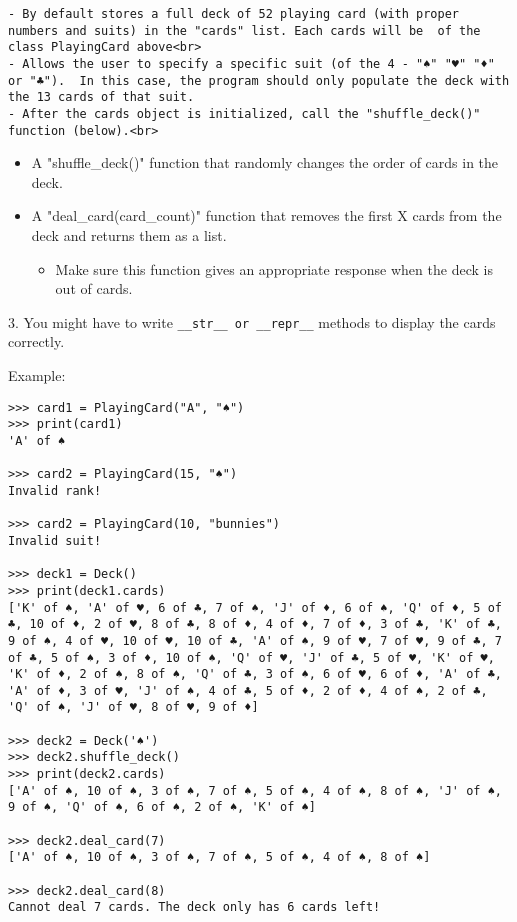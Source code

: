\documentclass[11pt]{article}
\providecommand{\tightlist}{%
      \setlength{\itemsep}{0pt}\setlength{\parskip}{0pt}}
\begin{document}
\begin{verbatim}
- By default stores a full deck of 52 playing card (with proper numbers and suits) in the "cards" list. Each cards will be  of the class PlayingCard above<br>
- Allows the user to specify a specific suit (of the 4 - "♠" "♥" "♦" or "♣").  In this case, the program should only populate the deck with the 13 cards of that suit.
- After the cards object is initialized, call the "shuffle_deck()" function (below).<br>
\end{verbatim}

\begin{itemize}
\tightlist
\item
  A "shuffle\_deck()" function that randomly changes the order of cards
  in the deck.
\item
  A "deal\_card(card\_count)" function that removes the first X cards
  from the deck and returns them as a list.

  \begin{itemize}
  \tightlist
  \item
    Make sure this function gives an appropriate response when the deck
    is out of cards.
  \end{itemize}
\end{itemize}

3. You might have to write \texttt{\_\_str\_\_\ or\ \_\_repr\_\_}
methods to display the cards correctly.

Example:

\begin{verbatim}
>>> card1 = PlayingCard("A", "♠")
>>> print(card1)
'A' of ♠

>>> card2 = PlayingCard(15, "♠")
Invalid rank!

>>> card2 = PlayingCard(10, "bunnies")
Invalid suit!

>>> deck1 = Deck()
>>> print(deck1.cards)
['K' of ♠, 'A' of ♥, 6 of ♣, 7 of ♠, 'J' of ♦, 6 of ♠, 'Q' of ♦, 5 of ♣, 10 of ♦, 2 of ♥, 8 of ♣, 8 of ♦, 4 of ♦, 7 of ♦, 3 of ♣, 'K' of ♣, 9 of ♠, 4 of ♥, 10 of ♥, 10 of ♣, 'A' of ♠, 9 of ♥, 7 of ♥, 9 of ♣, 7 of ♣, 5 of ♠, 3 of ♦, 10 of ♠, 'Q' of ♥, 'J' of ♣, 5 of ♥, 'K' of ♥, 'K' of ♦, 2 of ♠, 8 of ♠, 'Q' of ♣, 3 of ♠, 6 of ♥, 6 of ♦, 'A' of ♣, 'A' of ♦, 3 of ♥, 'J' of ♠, 4 of ♣, 5 of ♦, 2 of ♦, 4 of ♠, 2 of ♣, 'Q' of ♠, 'J' of ♥, 8 of ♥, 9 of ♦] 

>>> deck2 = Deck('♠')
>>> deck2.shuffle_deck()
>>> print(deck2.cards)
['A' of ♠, 10 of ♠, 3 of ♠, 7 of ♠, 5 of ♠, 4 of ♠, 8 of ♠, 'J' of ♠, 9 of ♠, 'Q' of ♠, 6 of ♠, 2 of ♠, 'K' of ♠]

>>> deck2.deal_card(7)
['A' of ♠, 10 of ♠, 3 of ♠, 7 of ♠, 5 of ♠, 4 of ♠, 8 of ♠]

>>> deck2.deal_card(8)
Cannot deal 7 cards. The deck only has 6 cards left!
\end{verbatim}
\end{document}
